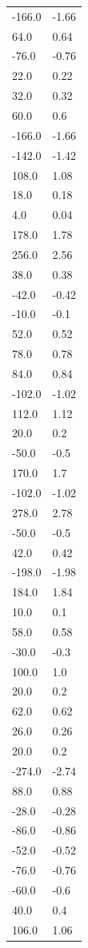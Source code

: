 \begin{longtable}{ll}
-166.0 & -1.66 \\
64.0 & 0.64 \\
-76.0 & -0.76 \\
22.0 & 0.22 \\
32.0 & 0.32 \\
60.0 & 0.6 \\
-166.0 & -1.66 \\
-142.0 & -1.42 \\
108.0 & 1.08 \\
18.0 & 0.18 \\
4.0 & 0.04 \\
178.0 & 1.78 \\
256.0 & 2.56 \\
38.0 & 0.38 \\
-42.0 & -0.42 \\
-10.0 & -0.1 \\
52.0 & 0.52 \\
78.0 & 0.78 \\
84.0 & 0.84 \\
-102.0 & -1.02 \\
112.0 & 1.12 \\
20.0 & 0.2 \\
-50.0 & -0.5 \\
170.0 & 1.7 \\
-102.0 & -1.02 \\
278.0 & 2.78 \\
-50.0 & -0.5 \\
42.0 & 0.42 \\
-198.0 & -1.98 \\
184.0 & 1.84 \\
10.0 & 0.1 \\
58.0 & 0.58 \\
-30.0 & -0.3 \\
100.0 & 1.0 \\
20.0 & 0.2 \\
62.0 & 0.62 \\
26.0 & 0.26 \\
20.0 & 0.2 \\
-274.0 & -2.74 \\
88.0 & 0.88 \\
-28.0 & -0.28 \\
-86.0 & -0.86 \\
-52.0 & -0.52 \\
-76.0 & -0.76 \\
-60.0 & -0.6 \\
40.0 & 0.4 \\
106.0 & 1.06 \\

\end{longtable}
